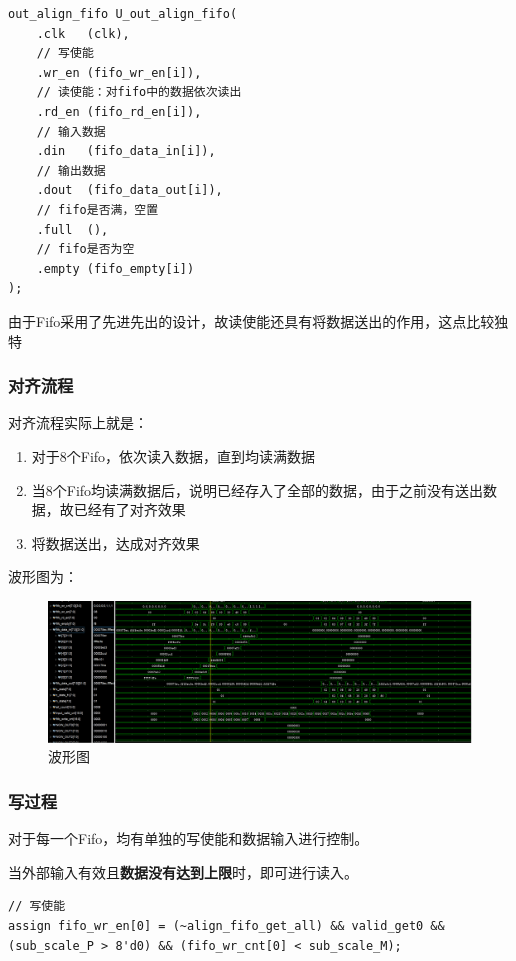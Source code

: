 \documentclass[12pt,a4paper]{article}
\begin{document}
\begin{lstlisting}
out_align_fifo U_out_align_fifo(
    .clk   (clk),
    // 写使能
    .wr_en (fifo_wr_en[i]),
    // 读使能：对fifo中的数据依次读出
    .rd_en (fifo_rd_en[i]),
    // 输入数据
    .din   (fifo_data_in[i]),
    // 输出数据
    .dout  (fifo_data_out[i]),
    // fifo是否满，空置
    .full  (),
    // fifo是否为空
    .empty (fifo_empty[i])
);
\end{lstlisting}

由于Fifo采用了先进先出的设计，故读使能还具有将数据送出的作用，这点比较独特

\subsubsection{对齐流程}

对齐流程实际上就是：

\begin{enumerate}
\item
  对于8个Fifo，依次读入数据，直到均读满数据
\item
  当8个Fifo均读满数据后，说明已经存入了全部的数据，由于之前没有送出数据，故已经有了对齐效果
\item
  将数据送出，达成对齐效果
\end{enumerate}

波形图为：

\begin{figure}[htbp]
    \centering
    \includegraphics[width=0.8\linewidth]{img/wave_9.png}
    \caption{波形图}
\end{figure}

\subsubsection{写过程}

对于每一个Fifo，均有单独的写使能和数据输入进行控制。

当外部输入有效且\textbf{数据没有达到上限}时，即可进行读入。

\begin{lstlisting}
// 写使能
assign fifo_wr_en[0] = (~align_fifo_get_all) && valid_get0 && (sub_scale_P > 8'd0) && (fifo_wr_cnt[0] < sub_scale_M);
\end{lstlisting}
\end{document}
